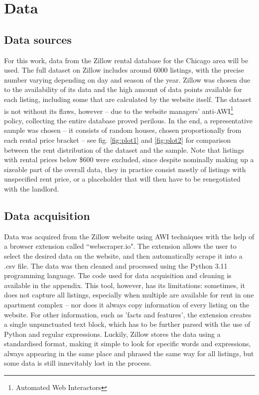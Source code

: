 \documentclass[12pt]{report}
\begin{document}
\section{Data}

\subsection{Data sources}

For this work, data from the Zillow rental database for the Chicago area will be used. The full dataset on Zillow includes around 6000 listings, with the precise number varying depending on day and season of the year. Zillow was chosen due to the availability of its data and the high amount of data points available for each listing, including some that are calculated by the website itself. The dataset is not without its flaws, however -- due to the website managers' anti-AWI\footnote{Automated Web Interactors} policy, collecting the entire database proved perilous. In the end, a representative sample was chosen -- it consists of random houses, chosen proportionally from each rental price bracket -- see fig. \ref{fig:plot1} and \ref{fig:plot2} for comparison between the rent distribution of the dataset and the sample. Note that listings with rental prices below \$600 were excluded, since despite nominally making up a sizeable part of the overall data, they in practice consist mostly of listings with unspecified rent price, or a placeholder that will then have to be renegotiated with the landlord.

\subsection{Data acquisition}
Data was acquired from the Zillow website using AWI techniques with the help of a browser extension called ``webscraper.io". The extension allows the user to select the desired data on the website, and then automatically scrape it into a .csv file. The data was then cleaned and processed using the Python 3.11 programming language. The code used for data acquisition and cleaning is available in the appendix. This tool, however, has its limitations: sometimes, it does not capture all listings, especially when multiple are available for rent in one apartment complex -- nor does it always copy information of every listing on the website. For other information, such as 'facts and features', the extension creates a single unpunctuated text block, which has to be further parsed with the use of Python and regular expressions. Luckily, Zillow stores the data using a standardised format, making it simple to look for specific words and expressions, always appearing in the same place and phrased the same way for all listings, but some data is still innevitably lost in the process.
\end{document}
